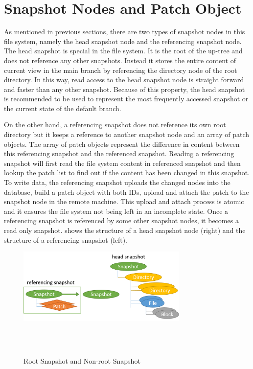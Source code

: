 \section{Snapshot Nodes and Patch Object}

    As mentioned in previous sections, there are two types of snapshot nodes in this file system, namely the head snapshot node and the referencing snapshot node. The head snapshot is special in the file system. It is the root of the up-tree and does not reference any other snapshots. Instead it stores the entire content of current view in the main branch by referencing the directory node of the root directory. In this way, read access to the head snapshot node is straight forward and faster than any other snapshot. Because of this property, the head snapshot is recommended to be used to represent the most frequently accessed snapshot or the current state of the default branch.

    On the other hand, a referencing snapshot does not reference its own root directory but it keeps a reference to another snapshot node and an array of patch objects. The array of patch objects represent the difference in content between this referencing snapshot and the referenced snapshot. Reading a referencing snapshot will first read the file system content in referenced snapshot and then lookup the patch list to find out if the content has been changed in this snapshot. To write data, the referencing snapshot uploads the changed nodes into the database, build a patch object with both IDs, upload and attach the patch to the snapshot node in the remote machine. This upload and attach process is atomic and it ensures the file system not being left in an incomplete state. Once a referencing snapshot is referenced by some other snapshot nodes, it becomes a read only snapshot.  shows the structure of a head snapshot node (right) and the structure of a referencing snapshot (left).
    
\begin{figure}[t]
\centering
\includegraphics[width=0.75\textwidth]{Chapter-4/figs/fig12.png}
\caption{Root Snapshot and Non-root Snapshot}
~\\
~\\
\label{fig:root_and_nonroot}
\end{figure}

